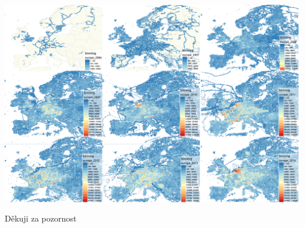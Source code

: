 \documentclass[unicode,bookmarksnumbered]{beamer}
\begin{document}
	\begin{frame}
	\centering
	\includegraphics[width=1\textwidth]{./img/osm/merge.png}
	
	\Huge Děkuji za pozornost
	\end{frame}
	
	
	
	
\end{document}
